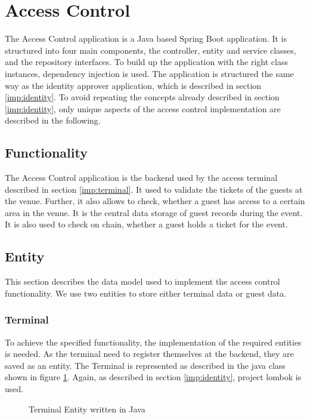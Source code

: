 \section{Access Control}
The Access Control application is a Java based Spring Boot application. It is structured into four main components, the controller, entity and service classes, and the repository interfaces. To build up the application with the right class instances, dependency injection is used. The application is structured the same way as the identity approver application, which is described in section \ref{imp:identity}. To avoid repeating the concepts already described in section \ref{imp:identity}, only unique aspects of the access control implementation are described in the following.

\subsection{Functionality}
The Access Control application is the backend used by the access terminal described in section \ref{imp:terminal}. It used to validate the tickets of the guests at the venue. Further, it also allows to check, whether a guest has access to a certain area in the venue. It is the central data storage of guest records during the event. It is also used to check on chain, whether a guest holds a ticket for the event.

\subsection{Entity}
This section describes the data model used to implement the access control functionality. We use two entities to store either terminal data or guest data.


\subsubsection{Terminal}
To achieve the specified functionality, the implementation of the required entities is needed. As the terminal need to register themselves at the backend, they are saved as an entity. The Terminal is represented as described in the java class shown in figure \ref{code:entity:access}. Again, as described in section \ref{imp:identity}, project lombok is used. 

\begin{figure}[H]
    
    \caption{Terminal Entity written in Java}
    \label{code:entity:access}
\end{figure}

